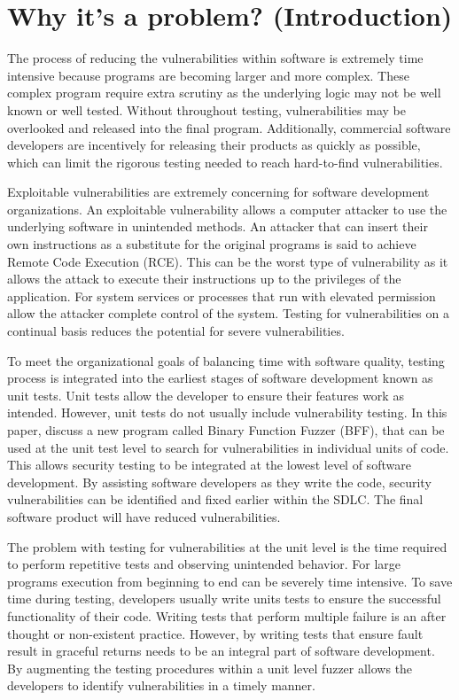 \documentclass[conference]{IEEEtran}
\begin{document}
\section{Why it's a problem? (Introduction)}
The process of reducing the vulnerabilities within software is extremely time intensive because programs are becoming larger and more complex. These complex program require extra scrutiny as the underlying logic may not be well known or well tested. Without throughout testing, vulnerabilities may be overlooked and released into the final program. Additionally, commercial software developers are incentively for releasing their products as quickly as possible, which can limit the rigorous testing needed to reach hard-to-find vulnerabilities. 

Exploitable vulnerabilities are extremely concerning for software development organizations. An exploitable vulnerability allows a computer attacker to use the underlying software in unintended methods. An attacker that can insert their own instructions as a substitute for the original programs is said to achieve Remote Code Execution (RCE). This can be the worst type of vulnerability as it allows the attack to execute their instructions up to the privileges of the application. For system services or processes that run with elevated permission allow the attacker complete control of the system. Testing for vulnerabilities on a continual basis reduces the potential for severe vulnerabilities.

To meet the organizational goals of balancing time with software quality, testing process is integrated into the earliest stages of software development known as unit tests. Unit tests allow the developer to ensure their features work as intended. However, unit tests do not usually include vulnerability testing. In this paper, discuss a new program called Binary Function Fuzzer (BFF), that can be used at the unit test level to search for vulnerabilities in individual units of code. This allows security testing to be integrated at the lowest level of software development. By assisting software developers as they write the code, security vulnerabilities can be identified and fixed earlier within the SDLC. The final software product will have reduced vulnerabilities. 

The problem with testing for vulnerabilities at the unit level is the time required to perform repetitive tests and observing unintended behavior. For large programs execution from beginning to end can be severely time intensive. To save time during testing, developers usually write units tests to ensure the successful functionality of their code. Writing tests that perform multiple failure is an after thought or non-existent practice. However, by writing tests that ensure fault result in graceful returns needs to be an integral part of software development. By augmenting the testing procedures within a unit level fuzzer allows the developers to identify vulnerabilities in a timely manner. 
\end{document}
